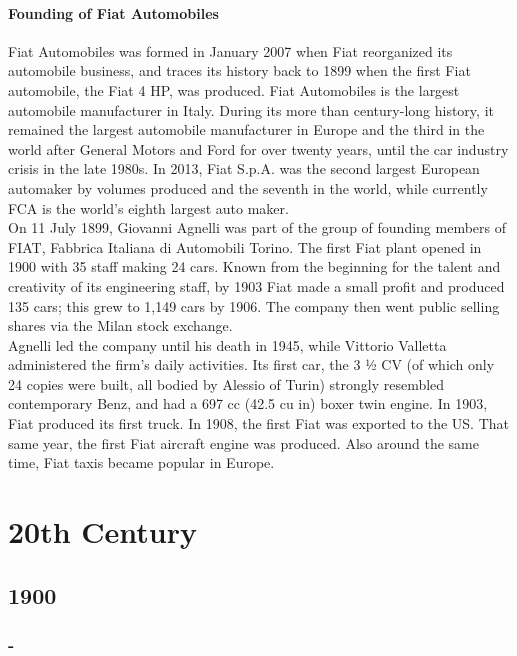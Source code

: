 \documentclass[11pt]{report}
\begin{document}
\subsection{Founding of Fiat Automobiles}
Fiat Automobiles was formed in January 2007 when Fiat reorganized its automobile business, and traces its history back to 1899 when the first Fiat automobile, the Fiat 4 HP, was produced. Fiat Automobiles is the largest automobile manufacturer in Italy. During its more than century-long history, it remained the largest automobile manufacturer in Europe and the third in the world after General Motors and Ford for over twenty years, until the car industry crisis in the late 1980s. In 2013, Fiat S.p.A. was the second largest European automaker by volumes produced and the seventh in the world, while currently FCA is the world's eighth largest auto maker.\\ \indent On 11 July 1899, Giovanni Agnelli was part of the group of founding members of FIAT, Fabbrica Italiana di Automobili Torino. The first Fiat plant opened in 1900 with 35 staff making 24 cars. Known from the beginning for the talent and creativity of its engineering staff, by 1903 Fiat made a small profit and produced 135 cars; this grew to 1,149 cars by 1906. The company then went public selling shares via the Milan stock exchange.\\
\indent Agnelli led the company until his death in 1945, while Vittorio Valletta administered the firm's daily activities. Its first car, the 3 ½ CV (of which only 24 copies were built, all bodied by Alessio of Turin) strongly resembled contemporary Benz, and had a 697 cc (42.5 cu in) boxer twin engine. In 1903, Fiat produced its first truck. In 1908, the first Fiat was exported to the US. That same year, the first Fiat aircraft engine was produced. Also around the same time, Fiat taxis became popular in Europe.

					
\part{20th Century}
\chapter{1900}
\section{-}
\end{document}
